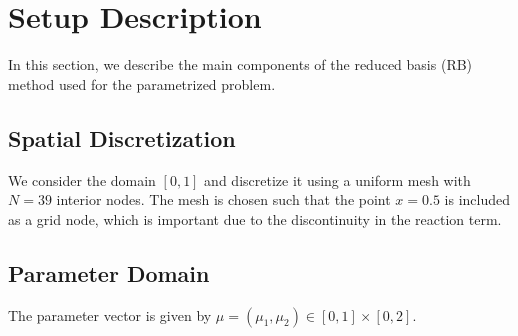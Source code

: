 \documentclass[11pt]{article}      %
\begin{document}









\section{Setup Description}

In this section, we describe the main components of the reduced basis (RB) method used for the parametrized problem.

\subsection{Spatial Discretization}

We consider the domain $[0,1]$ and discretize it using a uniform mesh with $N = 39$ interior nodes. The mesh is chosen such that the point $x = 0.5$ is included as a grid node, which is important due to the discontinuity in the reaction term.

\subsection{Parameter Domain}

The parameter vector is given by $\mu = (\mu_1, \mu_2) \in [0,1] \times [0,2]$.
\end{document}
